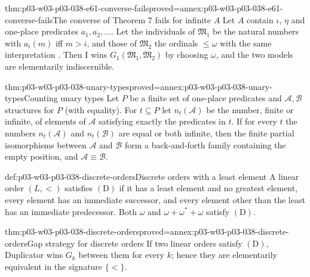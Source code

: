 \begin{hbtheorem}{thm:p03-w03-p03-038-e61-converse-fails}{proved=annex:p03-w03-p03-038-e61-converse-fails}{The converse of Theorem 7 fails for infinite \(A\)}
Let \(A\) contain \(\iota\), \(\eta\) and one-place predicates
\(a_1,a_2,\ldots\). Let the individuals of \(\mathfrak M_1\) be the natural
numbers with \(a_i(m)\) iff \(m>i\), and those of \(\mathfrak M_2\) the
ordinals \(\le\omega\) with the same interpretation
\cite[p.~136]{Ehrenfeucht1961}. Then I wins
\(G_1(\mathfrak M_1,\mathfrak M_2)\) by choosing \(\omega\), and the two
models are elementarily indiscernible.
\end{hbtheorem}

\begin{hblemma}{thm:p03-w03-p03-038-unary-types}{proved=annex:p03-w03-p03-038-unary-types}{Counting unary types}
Let \(P\) be a finite set of one-place predicates and \(\mathcal A,\mathcal
B\) structures for \(P\) (with equality). For \(t\subseteq P\) let
\(n_t(\mathcal A)\) be the number, finite or infinite, of elements of
\(\mathcal A\) satisfying exactly the predicates in \(t\). If for every
\(t\) the numbers \(n_t(\mathcal A)\) and \(n_t(\mathcal B)\) are equal or
both infinite, then the finite partial isomorphisms between \(\mathcal A\)
and \(\mathcal B\) form a back-and-forth family containing the empty
position, and \(\mathcal A\equiv\mathcal B\).
\end{hblemma}

\begin{hbdefinition}{def:p03-w03-p03-038-discrete-orders}{Discrete orders with a least element}
A linear order \((L,<)\) satisfies \((\mathrm D)\) if it has a least element
and no greatest element, every element has an immediate successor, and every
element other than the least has an immediate predecessor. Both \(\omega\)
and \(\omega+\omega^*+\omega\) satisfy \((\mathrm D)\).
\end{hbdefinition}

\begin{hblemma}{thm:p03-w03-p03-038-discrete-orders}{proved=annex:p03-w03-p03-038-discrete-orders}{Gap strategy for discrete orders}
If two linear orders satisfy \((\mathrm D)\), Duplicator wins
\(G_k\) between them for every \(k\); hence they are elementarily
equivalent in the signature \(\{<\}\).
\end{hblemma}


